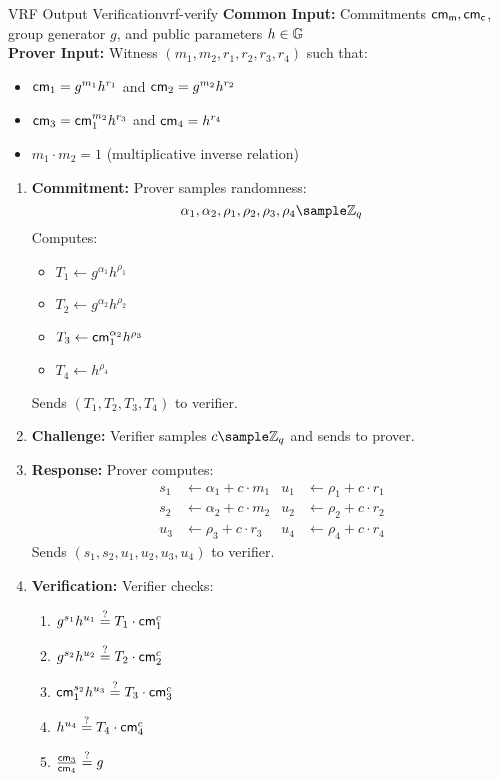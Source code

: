 \newpage
\begin{protocol}{VRF Output Verification}{vrf-verify}\label{pok-vrf}
\textbf{Common Input:} Commitments $\mathsf{cm_m}, \mathsf{cm_c}$, group generator $g$, and public parameters $h \in \mathbb{G}$\\
\textbf{Prover Input:} Witness $(m_1, m_2, r_1, r_2, r_3, r_4)$ such that:
\begin{itemize}
    \item $\mathsf{cm}_1 = g^{m_1}h^{r_1}$ and $\mathsf{cm}_2 = g^{m_2}h^{r_2}$
    \item $\mathsf{cm}_3 = \mathsf{cm}_1^{m_2}h^{r_3}$ and $\mathsf{cm}_4 = h^{r_4}$
    \item $m_1 \cdot m_2 = 1$ (multiplicative inverse relation)
\end{itemize}

\begin{enumerate}
    \item \textbf{Commitment:} Prover samples randomness:
    \[
        \alpha_1, \alpha_2, \rho_1, \rho_2, \rho_3, \rho_4 \sample \Z_q
    \]
    Computes:
    \begin{itemize}
        \item $T_1 \gets g^{\alpha_1}h^{\rho_1}$
        \item $T_2 \gets g^{\alpha_2}h^{\rho_2}$
        \item $T_3 \gets \mathsf{cm}_1^{\alpha_2}h^{\rho_3}$
        \item $T_4 \gets h^{\rho_4}$
    \end{itemize}
    Sends $(T_1, T_2, T_3, T_4)$ to verifier.
    
    \item \textbf{Challenge:} Verifier samples $c \sample \Z_q$ and sends to prover.
    
    \item \textbf{Response:} Prover computes:
    \begin{align*}
        s_1 &\gets \alpha_1 + c \cdot m_1 &u_1 &\gets \rho_1 + c \cdot r_1\\
        s_2 &\gets \alpha_2 + c \cdot m_2 &u_2 &\gets \rho_2 + c \cdot r_2\\
        u_3 &\gets \rho_3 + c \cdot r_3 &u_4 &\gets \rho_4 + c \cdot r_4
    \end{align*}
    Sends $(s_1, s_2, u_1, u_2, u_3, u_4)$ to verifier.
    
    \item \textbf{Verification:} Verifier checks:
    \begin{enumerate}[label=(\roman*)]
        \item $g^{s_1}h^{u_1} \stackrel{?}{=} T_1 \cdot \mathsf{cm}_1^c$
        \item $g^{s_2}h^{u_2} \stackrel{?}{=} T_2 \cdot \mathsf{cm}_2^c$
        \item $\mathsf{cm}_1^{s_2}h^{u_3} \stackrel{?}{=} T_3 \cdot \mathsf{cm}_3^c$
        \item $h^{u_4} \stackrel{?}{=} T_4 \cdot \mathsf{cm}_4^c$
        \item $\frac{\mathsf{cm}_3}{\mathsf{cm}_4} \stackrel{?}{=} g$
    \end{enumerate}
\end{enumerate}
\end{protocol}
